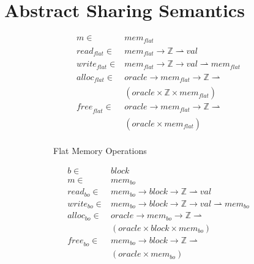 \documentclass{article}
\begin{document}
\section{Abstract Sharing Semantics}

\begin{figure}
  \begin{subfigure}{0.5\textwidth}
    \[\begin{split}
    m \in & \mathit{mem}_{\mathit{flat}} \\
    \mathit{read}_{\mathit{flat}} \in & \mathit{mem}_{\mathit{flat}} \rightarrow
    \mathbb{Z} \rightharpoonup \mathit{val} \\
    \mathit{write}_{\mathit{flat}} \in & \mathit{mem}_{\mathit{flat}} \rightarrow
    \mathbb{Z} \rightarrow \mathit{val} \rightharpoonup \mathit{mem}_{\mathit{flat}} \\
    \mathit{alloc}_{\mathit{flat}} \in & \mathit{oracle} \rightarrow
    \mathit{mem}_{\mathit{flat}} \rightarrow \mathbb{Z} \rightharpoonup \\
    & (\mathit{oracle} \times \mathbb{Z}
    \times \mathit{mem}_{\mathit{flat}}) \\
    \mathit{free}_{\mathit{flat}} \in & \mathit{oracle} \rightarrow \mathit{mem}_{\mathit{flat}} \rightarrow
    \mathbb{Z} \rightharpoonup \\
    & (\mathit{oracle} \times \mathit{mem}_{\mathit{flat}}) \\
    \end{split}\]

    \caption{Flat Memory Operations}
    \label{fig:flat}
  \end{subfigure}
  \begin{subfigure}{0.5\textwidth}
    \[\begin{split}
    b \in & \mathit{block} \\
    m \in & \mathit{mem}_{bo} \\
    \mathit{read}_{bo} \in & \mathit{mem}_{bo} \rightarrow \mathit{block} \rightarrow
    \mathbb{Z} \rightharpoonup \mathit{val} \\
    \mathit{write}_{bo} \in & \mathit{mem}_{bo} \rightarrow \mathit{block} \rightarrow
    \mathbb{Z} \rightarrow \mathit{val} \rightharpoonup \mathit{mem}_{bo} \\
    \mathit{alloc}_{bo} \in & \mathit{oracle} \rightarrow \mathit{mem}_{bo} \rightarrow
    \mathbb{Z} \rightharpoonup \\
    & (\mathit{oracle} \times \mathit{block} \times \mathit{mem}_{bo}) \\
    \mathit{free}_{bo} \in & \mathit{mem}_{bo} \rightarrow \mathit{block} \rightarrow
    \mathbb{Z} \rightharpoonup \\
    & (\mathit{oracle} \times \mathit{mem}_{bo}) \\
    \end{split}\]
    

\end{subfigure}
\end{figure}
\end{document}
